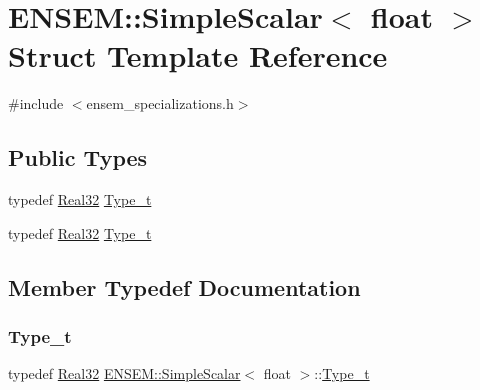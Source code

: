 \hypertarget{structENSEM_1_1SimpleScalar_3_01float_01_4}{}\section{E\+N\+S\+EM\+:\+:Simple\+Scalar$<$ float $>$ Struct Template Reference}
\label{structENSEM_1_1SimpleScalar_3_01float_01_4}


{\ttfamily \#include $<$ensem\+\_\+specializations.\+h$>$}

\subsection*{Public Types}
\begin{DoxyCompactItemize}
\item 
typedef \mbox{\hyperlink{group__defs_gab601f1c55eb75baed0a0859b3fec6bc1}{Real32}} \mbox{\hyperlink{structENSEM_1_1SimpleScalar_3_01float_01_4_a941f810256ed04a2e1880d93b6d09c9b}{Type\+\_\+t}}
\item 
typedef \mbox{\hyperlink{group__defs_gab601f1c55eb75baed0a0859b3fec6bc1}{Real32}} \mbox{\hyperlink{structENSEM_1_1SimpleScalar_3_01float_01_4_a941f810256ed04a2e1880d93b6d09c9b}{Type\+\_\+t}}
\end{DoxyCompactItemize}


\subsection{Member Typedef Documentation}
\mbox{\label{structENSEM_1_1SimpleScalar_3_01float_01_4_a941f810256ed04a2e1880d93b6d09c9b}} 
\subsubsection{\texorpdfstring{Type\_t}{Type\_t}\hspace{0.1cm}{\footnotesize\ttfamily [1/2]}}
{\footnotesize\ttfamily typedef \mbox{\hyperlink{group__defs_gab601f1c55eb75baed0a0859b3fec6bc1}{Real32}} \mbox{\hyperlink{structENSEM_1_1SimpleScalar}{E\+N\+S\+E\+M\+::\+Simple\+Scalar}}$<$ float $>$\+::\mbox{\hyperlink{structENSEM_1_1SimpleScalar_3_01float_01_4_a941f810256ed04a2e1880d93b6d09c9b}{Type\+\_\+t}}}

